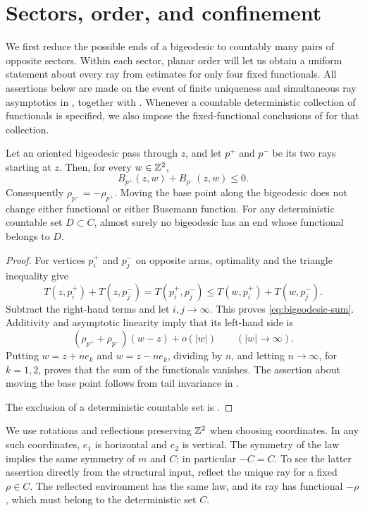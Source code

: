 \section{Sectors, order, and confinement}\label{sec:sectors}

We first reduce the possible ends of a bigeodesic to countably many pairs of
opposite sectors.  Within each sector, planar order will let us obtain a
uniform statement about every ray from estimates for only four fixed
functionals.  All assertions below are made on the event of finite
uniqueness and simultaneous ray asymptotics in , together
with .  Whenever a countable deterministic collection
of functionals is specified, we also impose the fixed-functional conclusions
of  for that collection.

\begin{lemma}\label{lem:opposite}
Let an oriented bigeodesic pass through $z$, and let $p^+$ and $p^-$ be its
two rays starting at $z$.  Then, for every $w\in\mathbb Z^2$,
\begin{equation}\label{eq:bigeodesic-sum}
 B_{p^+}(z,w)+B_{p^-}(z,w)\leq 0.
\end{equation}
Consequently $\rho_{p^-}=-\rho_{p^+}$.  Moving the base point along the
bigeodesic does not change either functional or either Busemann function.
For any deterministic countable set $D\subset C$, almost surely no
bigeodesic has an end whose functional belongs to $D$.
\end{lemma}

\begin{proof}
For vertices $p_i^+$ and $p_j^-$ on opposite arms, optimality and the triangle
inequality give
\[
 T(z,p_i^+)+T(z,p_j^-)
 =T(p_i^+,p_j^-)
 \leq T(w,p_i^+)+T(w,p_j^-).
\]
Subtract the right-hand terms and let $i,j\to\infty$.  This proves
\eqref{eq:bigeodesic-sum}.  Additivity and asymptotic linearity imply that
its left-hand side is
\[
 (\rho_{p^+}+\rho_{p^-})(w-z)+o(|w|)
 \qquad (|w|\to\infty).
\]
Putting $w=z+ne_k$ and $w=z-ne_k$, dividing by $n$, and letting
$n\to\infty$, for $k=1,2$, proves that the sum of the functionals vanishes.
The assertion about moving the base point follows from tail invariance in
.

The exclusion of a deterministic countable set is .
\end{proof}

We use rotations and reflections preserving $\mathbb Z^2$ when choosing coordinates.
In any such coordinates, $e_1$ is horizontal and $e_2$ is vertical.
The symmetry of the law implies the same symmetry of $m$ and $C$; in
particular $-C=C$.  To see the latter assertion directly from the structural
input, reflect the unique ray for a fixed $\rho\in C$.  The reflected
environment has the same law, and its ray has functional $-\rho$, which must
belong to the deterministic set $C$.

